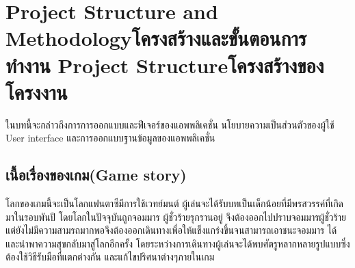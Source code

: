 \chapter{\ifproject%
\ifenglish Project Structure and Methodology\else โครงสร้างและขั้นตอนการทำงาน\fi
\else%
\ifenglish Project Structure\else โครงสร้างของโครงงาน\fi
\fi
}

\enskip \enskip \enskip \enskip \enskip ในบทนี้จะกล่าวถึงการการออกแบบและฟีเจอร์ของแอพพลิเคชั่น นโยบายความเป็นส่วนตัวของผู้ใช้ User interface และการออกแบบฐานข้อมูลของแอพพลิเคชั่น



\makeatletter


\makeatother

\section{เนื้อเรื่องของเกม(Game story)}
\enskip \enskip \enskip \enskip \enskip โลกของเกมนี้จะเป็นโลกแฟนตาซีมีการใช้เวทย์มนต์ ผู้เล่นจะได้รับบทเป็นเด็กน้อยที่มีพรสวรรค์ที่เกิดมาในรอบพันปี โดยโลกในปัจจุบันถูกจอมมาร
ผู้ชั่วร้ายรุกรานอยู่ จึงต้องออกไปปราบจอมมารผู้ชั่วร้าย แต่ยังไม่มีความสามรถมากพอจึงต้องออกเดินทางเพื่อให้แข็งแกร่งขึ้นจนสามารถเอาชนะจอมมาร
ได้และนำพาความสุขกลับมาสู่โลกอีกครั้ง โดยระหว่างการเดินทางผู้เล่นจะได้พบศัตรูหลากหลายรูปแบบซึ่งต้องใช้วิธีรับมือที่แตกต่างกัน 
และแก้ไขปริศนาต่างๆภายในเกม

